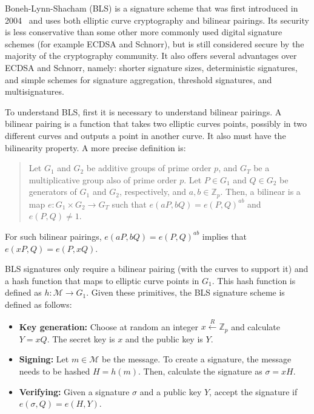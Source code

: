 \documentclass[conference]{IEEEtran}
\begin{document}
Boneh-Lynn-Shacham (BLS) is a signature scheme that was first introduced in 2004~\cite{boneh2001short} and uses both elliptic curve cryptography and bilinear pairings. Its security is less conservative than some other more commonly used digital signature schemes (for example ECDSA and Schnorr), but is still considered secure by the majority of the cryptography community. It also offers several advantages over ECDSA and Schnorr, namely: shorter signature sizes, deterministic signatures, and simple schemes for signature aggregation, threshold signatures, and multisignatures.

To understand BLS, first it is necessary to understand bilinear pairings. A bilinear pairing is a function that takes two elliptic curves points, possibly in two different curves and outputs a point in another curve. It also must have the bilinearity property. A more precise definition is:

\begin{quote}
	Let $G_1$ and $G_2$ be additive groups of prime order $p$, and $G_T$ be a multiplicative group also of prime order $p$. Let $P \in G_1$ and $Q \in G_2$ be generators of $G_1$ and $G_2$, respectively, and $a,b \in \mathbb{Z}_p$. Then, a bilinear is a map $e: G_1 \times G_2 \to G_T$ such that $e(aP, bQ)=e(P, Q)^{ab}$ and $e(P, Q) \neq 1$.
\end{quote}

For such bilinear pairings, $e(aP, bQ)=e(P, Q)^{ab}$ implies that $e(xP, Q)=e(P, xQ)$.

BLS signatures only require a bilinear pairing (with the curves to support it) and a hash function that maps to elliptic curve points in $G_1$. This hash function is defined as $h: \mathcal{M} \to G_1$. Given these primitives, the BLS signature scheme is defined as follows:

\begin{itemize}
	\item \textbf{Key generation:} Choose at random an integer $x \xleftarrow{R} \mathbb{Z}_p$ and calculate $Y=xQ$. The secret key is $x$ and the public key is $Y$.
	\item \textbf{Signing:} Let $m \in \mathcal{M}$ be the message. To create a signature, the message needs to be hashed $H=h(m)$. Then, calculate the signature as $\sigma = xH$.
	\item \textbf{Verifying:} Given a signature $\sigma$ and a public key $Y$, accept the signature if $e(\sigma, Q)=e(H, Y)$.
\end{itemize}
\end{document}
